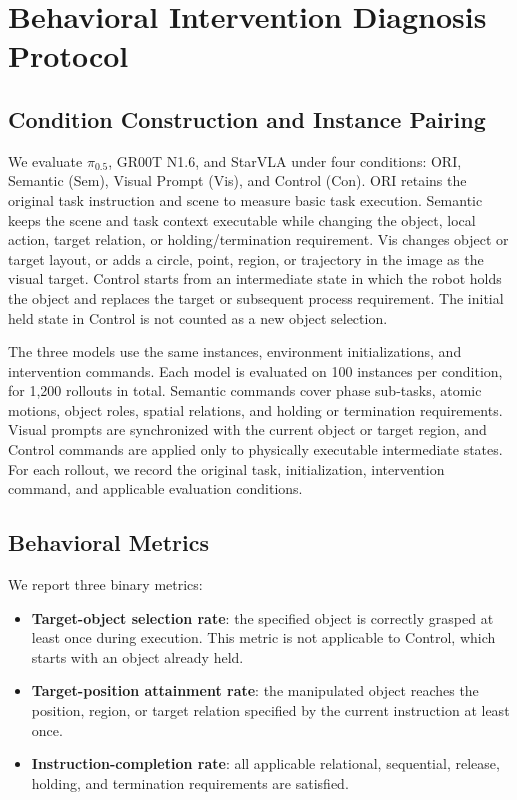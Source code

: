 \section{Behavioral Intervention Diagnosis Protocol}
\label{appendix:behavior-diagnostics}

\subsection{Condition Construction and Instance Pairing}

We evaluate $\pi_{0.5}$, GR00T N1.6, and StarVLA under four conditions:
ORI, Semantic (Sem), Visual Prompt (Vis), and Control (Con). ORI retains the original task
instruction and scene to
measure basic task execution. Semantic keeps the scene and task context
executable while changing the object, local action, target relation, or
holding/termination requirement. Vis changes object or target layout,
or adds a circle, point, region, or trajectory in the image as the visual
target. Control starts from an intermediate state in which the robot holds
the object and replaces the target or subsequent process requirement.
The initial held state in Control is not counted as a new object
selection.

The three models use the same instances, environment initializations, and
intervention commands. Each model is evaluated on 100 instances per
condition, for 1,200 rollouts in total. Semantic commands cover phase
sub-tasks, atomic motions, object roles, spatial relations, and holding or
termination requirements. Visual prompts are synchronized with the current
object or target region, and Control commands are applied only to
physically executable intermediate states. For each rollout, we record the original
task, initialization, intervention command, and applicable evaluation conditions.

\subsection{Behavioral Metrics}

We report three binary metrics:

\begin{itemize}
\item
  \textbf{Target-object selection rate}: the specified object is correctly
  grasped at least once during execution. This metric is not applicable
  to Control, which starts with an object already held.
\item
  \textbf{Target-position attainment rate}: the manipulated object reaches
  the position, region, or target relation specified by the current
  instruction at least once.
\item
  \textbf{Instruction-completion rate}: all applicable relational,
  sequential, release, holding, and termination requirements are
  satisfied.
\end{itemize}


